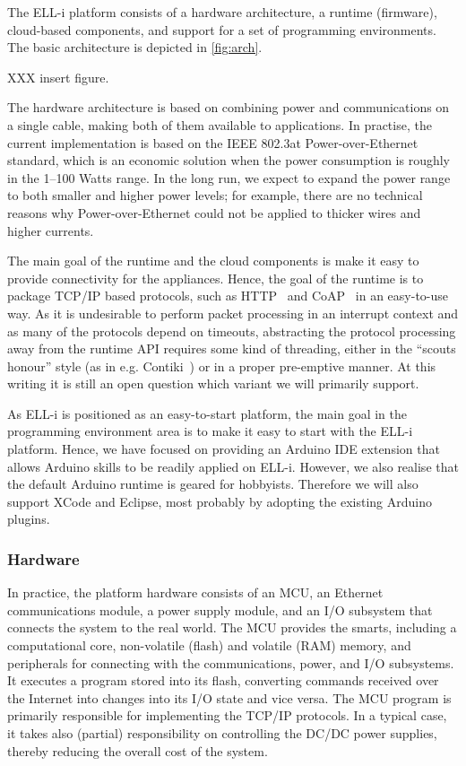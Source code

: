 \documentclass[draft,a4paper]{siamltex}
\begin{document}
The ELL-i platform consists of a hardware architecture, a runtime
(firmware), cloud-based components, and support for a set of
programming environments.  The basic architecture is depicted in
\ref{fig:arch}.

XXX insert figure.

The hardware architecture is based on combining power and
communications on a single cable, making both of them available to
applications.  In practise, the current implementation is based on the
IEEE 802.3at Power-over-Ethernet standard, which is an economic
solution when the power consumption is roughly in the 1--100 Watts
range.  In the long run, we expect to expand the power range to both
smaller and higher power levels; for example, there are no technical
reasons why Power-over-Ethernet could not be applied to thicker wires
and higher currents.

The main goal of the runtime and the cloud components is make it easy
to provide connectivity for the appliances.  Hence, the goal of the
runtime is to package TCP/IP based protocols, such as HTTP~\cite{HTTP}
and CoAP~\cite{CoAP} in an easy-to-use way.  As it is undesirable to
perform packet processing in an interrupt context and as many of the
protocols depend on timeouts, abstracting the protocol processing away
from the runtime API requires some kind of threading, either in the
``scouts honour'' style (as in e.g. Contiki~\cite{Contiki-scheduler})
or in a proper pre-emptive manner.  At this writing it is still an
open question which variant we will primarily support.

As ELL-i is positioned as an easy-to-start platform, the main goal in
the programming environment area is to make it easy to start with the
ELL-i platform.  Hence, we have focused on providing an Arduino IDE
extension that allows Arduino skills to be readily applied on ELL-i.
However, we also realise that the default Arduino runtime is geared
for hobbyists.  Therefore we will also support XCode and Eclipse, most
probably by adopting the existing Arduino plugins.

\subsubsection{Hardware}

In practice, the platform hardware consists of an MCU, an Ethernet
communications module, a power supply module, and an I/O subsystem
that connects the system to the real world.  The MCU provides the
smarts, including a computational core, non-volatile (flash) and
volatile (RAM) memory, and peripherals for connecting with the
communications, power, and I/O subsystems.  It executes a program
stored into its flash, converting commands received over the Internet
into changes into its I/O state and vice versa.  The MCU program is
primarily responsible for implementing the TCP/IP protocols.  In a
typical case, it takes also (partial) responsibility on controlling
the DC/DC power supplies, thereby reducing the overall cost of the
system.
\end{document}
